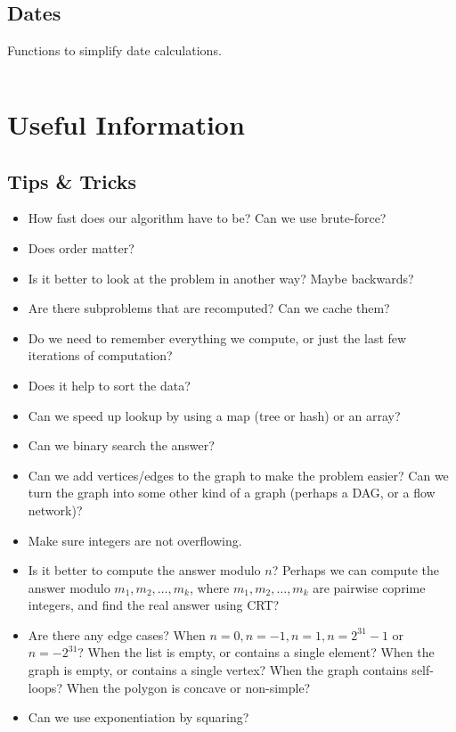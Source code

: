 \documentclass[8pt,a4paper]{amsart}
\newcommand{\code}[1]{\inputminted[linenos]{cpp}{_code/#1}}
\begin{document}
    \subsection{Dates}
        Functions to simplify date calculations.
        \code{other/dates.cpp}


\section{Useful Information}
    \subsection{Tips \&{} Tricks}
        \begin{itemize}
            \item How fast does our algorithm have to be? Can we use
                brute-force?
            \item Does order matter?
            \item Is it better to look at the problem in another way? Maybe
                backwards?
            \item Are there subproblems that are recomputed? Can we cache them?
            \item Do we need to remember everything we compute, or just the
                last few iterations of computation?
            \item Does it help to sort the data?
            \item Can we speed up lookup by using a map (tree or hash) or an
                array?
            \item Can we binary search the answer?
            \item Can we add vertices/edges to the graph to make the problem
                easier? Can we turn the graph into some other kind of a graph
                (perhaps a DAG, or a flow network)?
            \item Make sure integers are not overflowing.
            \item Is it better to compute the answer modulo $n$? Perhaps we can
                compute the answer modulo $m_1,m_2,\ldots,m_k$, where
                $m_1,m_2,\ldots,m_k$ are pairwise coprime integers, and find
                the real answer using CRT?
            \item Are there any edge cases? When $n=0, n=-1, n=1, n=2^{31}-1$
                or $n=-2^{31}$? When the list is empty, or contains a single
                element? When the graph is empty, or contains a single vertex?
                When the graph contains self-loops?  When the polygon is
                concave or non-simple?
            \item Can we use exponentiation by squaring?
        \end{itemize}
\end{document}
